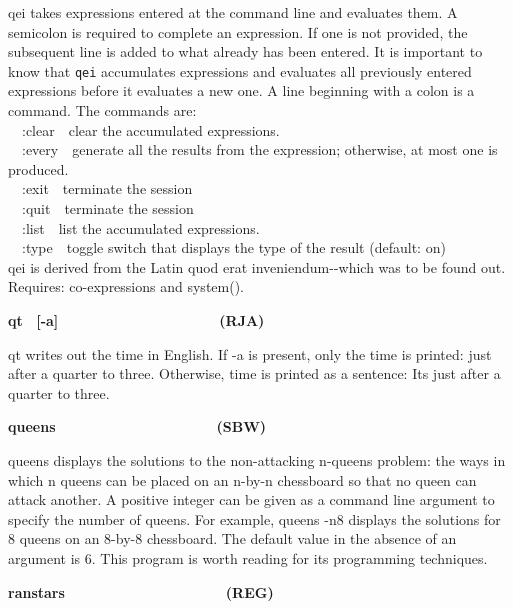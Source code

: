 \textsf{qei} takes expressions entered at the command line and evaluates
them. A semicolon is required to complete an expression. If one is not
provided, the subsequent line is added to what already has been
entered. It is important to know that \texttt{qei} accumulates
expressions and evaluates all previously entered expressions before it
evaluates a new one. A line beginning with a colon is a command. The
commands are:\\
\ \ :clear\ \ clear the accumulated expressions.\\
\ \ :every\ \ generate all the results from the expression; otherwise,
at most one is produced.\\
\ \ :exit\ \ terminate the session\\
\ \ :quit\ \ terminate the session\\
\ \ :list\ \ list the accumulated expressions.\\
\ \ :type\ \ toggle switch that displays the type of the result
(default: on)\\
{\textquotedbl}qei{\textquotedbl} is derived from the Latin
{\textquotedbl}quod erat
inveniendum{\textquotedbl}-{}-{\textquotedbl}which was to be found
out{\textquotedbl}. Requires: co-expressions and \textsf{system()}.

{\sffamily\bfseries
qt
\ \textrm{\textmd{[-a]\ \ \ \ \ \ \ \ \ \ \ \ \ \ \ \ \ \ \ \ }}(RJA)}

\textsf{qt} writes out the time in English. If \textsf{{}-a} is present,
only the time is printed: \textsf{just after a quarter to three.}
Otherwise, time is printed as a sentence: \textsf{It{\textquotesingle}s
just after a quarter to three}.

{\sffamily\bfseries
queens\ \ \ \ \ \ \ \ \ \ \ \ \ \ \ \ \ \ \ \ (SBW)}

\textsf{queens} displays the solutions to the non-attacking
n-queens problem: the ways in which n queens can be
placed on an n-by-n chessboard so that no queen can attack another. A
positive integer can be given as a command line argument to specify the
number of queens. For example, \textsf{queens -n8} displays the
solutions for 8 queens on an 8-by-8 chessboard. The default value in
the absence of an argument is 6. This program is worth reading for its
programming techniques.

{\sffamily\bfseries
ranstars\ \ \ \ \ \ \ \ \ \ \ \ \ \ \ \ \ \ \ \ (REG)}

